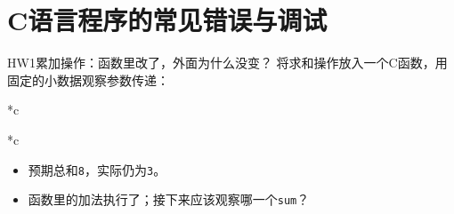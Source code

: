 \section{C语言程序的常见错误与调试}

\begin{frame}{HW1累加操作：函数里改了，外面为什么没变？}
    将求和操作放入一个C函数，用固定的小数据观察参数传递：
    \begin{Code}*{c}
        
    \end{Code}
    \begin{Code}*{c}
        
    \end{Code}
    \begin{itemize}
        \item 预期总和\texttt{8}，实际仍为\texttt{3}。
        \item 函数里的加法执行了；接下来应该观察哪一个\texttt{sum}？
    \end{itemize}
\end{frame}

